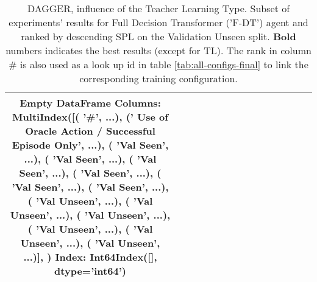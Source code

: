\begin{table}
\centering
\caption{\label{tab:f_dt_dagger_pe_oa}DAGGER, influence of the Teacher Learning Type. Subset of experiments' results for Full Decision Transformer ('F-DT') agent and ranked by descending SPL on the Validation Unseen split. \textbf{Bold} numbers indicates the best results (except for TL). The rank in column \# is also used as a look up id in table \ref{tab:all-configs-final} to link the corresponding training configuration.}
\begin{tabular}{@{\hskip3pt}c@{\hskip3pt}c@{\hskip3pt}c@{\hskip3pt}c@{\hskip3pt}c@{\hskip3pt}c@{\hskip3pt}c@{\hskip3pt}c@{\hskip3pt}c@{\hskip3pt}c@{\hskip3pt}c@{\hskip3pt}c@{\hskip3pt}c@{\hskip3pt}c@{\hskip3pt}c}
\toprule
Empty DataFrame
Columns: MultiIndex([(                                             '\textbf{\#}', ...),
            ('\textbf{ Use of Oracle Action / Successful Episode Only}', ...),
            (                                       '\textbf{Val Seen}', ...),
            (                                       '\textbf{Val Seen}', ...),
            (                                       '\textbf{Val Seen}', ...),
            (                                       '\textbf{Val Seen}', ...),
            (                                       '\textbf{Val Seen}', ...),
            (                                       '\textbf{Val Seen}', ...),
            (                                     '\textbf{Val Unseen}', ...),
            (                                     '\textbf{Val Unseen}', ...),
            (                                     '\textbf{Val Unseen}', ...),
            (                                     '\textbf{Val Unseen}', ...),
            (                                     '\textbf{Val Unseen}', ...),
            (                                     '\textbf{Val Unseen}', ...)],
           )
Index: Int64Index([], dtype='int64') \\
\bottomrule
\end{tabular}
\end{table}
